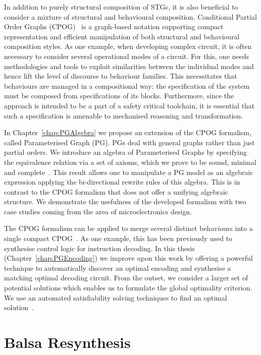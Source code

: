 In addition to purely structural composition of STGs, it is also beneficial to consider a mixture of 
structural and behavioural composition. Conditional Partial Order Graphs (CPOG)~\cite{2009_mokhov_phd} is a graph-based notation supporting compact
representation and efficient manipulation of both structural and behavioural composition styles. As one example, when developing complex circuit, it is
often necessary to consider several operational modes of a circuit. 
For this, one needs methodologies and tools to exploit similarities between
the individual modes and hence lift the level of discourse to behaviour families.
This necessitates that behaviours are managed in a compositional
way: the specification of the system must be composed from specifications
of its blocks. Furthermore, since the approach is intended to be a part of a safety critical toolchain, it is essential that such a  specification is amenable to mechanised reasoning and transformation.

In Chapter~\ref{chap:PGAlgebra} we propose an extension of the CPOG formalism, called Parameterised Graph (PG).
PGs deal with general graphs rather than just partial orders. We introduce an algebra of Parameterised Graphs by specifying the
equivalence relation via a set of axioms, which we prove to be sound,
minimal and complete~\cite{pg_algebra}. This result allows one to manipulate a PG model
as an algebraic expression applying the bi-directional rewrite rules of this algebra. This is  in contrast to the CPOG formalism that does not offer a unifying algebraic structure. We demonstrate
the usefulness of the developed formalism with two case studies coming
from the area of microelectronics design.

The CPOG formalism can be applied to merge several distinct behaviours
into a single compact CPOG~\cite{2009_mokhov_phd}. As one example, this has been previously used to
synthesise control logic for instruction decoding. In this thesis (Chapter~\ref{chap:PGEncoding}) 
we improve upon this work by offering a powerful technique to automatically discover an optimal encoding and
synthesise a matching optimal decoding circuit. From the outset, we consider a larger set of potential solutions
which enables us to formulate the global optimality criterion. We use an automated satisfiability solving 
techniques to find an optimal solution~\cite{cpog_encoding}.


\section{Balsa Resynthesis\label{sec:Balsa-Introduction}}

